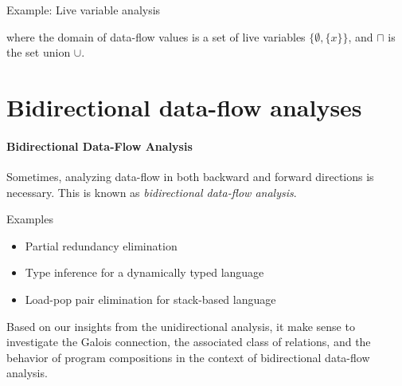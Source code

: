 \documentclass{llncs}
\newcommand{\meet}{\sqcap}
\begin{document}
  Example: Live variable analysis
   \begin{center}
  \end{center}

  where the domain of data-flow values is a set of live variables $\{\emptyset, \{ x \}\}$, and $\meet$ is the set union $\cup$.

\section{Bidirectional data-flow analyses}  

  \paragraph{Bidirectional Data-Flow Analysis}
  Sometimes, analyzing data-flow in both backward and forward directions is necessary. This is known as \emph{bidirectional data-flow analysis}.


  Examples
  \begin{itemize}
    \item Partial redundancy elimination
    \item Type inference for a dynamically typed language
    \item Load-pop pair elimination for stack-based language
  \end{itemize}
  Based on our insights from the unidirectional analysis, it make sense to investigate the Galois connection, the associated class of relations, and the behavior of program compositions in the context of bidirectional data-flow analysis.
\end{document}
